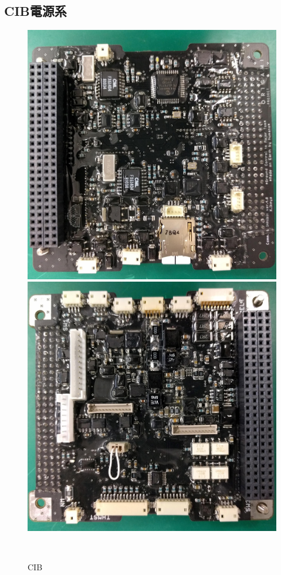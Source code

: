 \subsection{CIB電源系}

\begin{figure}[htbp]
	\begin{minipage}{0.5\hsize}
		\begin{center}
			\includegraphics[width=0.7
			\linewidth]{./03/fig/CIB_1.jpg}
		\end{center}
	\end{minipage}
	\begin{minipage}{0.5\hsize}
		\begin{center}
			\includegraphics[width=0.7\linewidth]{./03/fig/CIB_2.jpg}
		\end{center}
	\end{minipage}\\		
	\begin{center}
		\caption{CIB}
	\end{center}
\label{CIB}
\end{figure}


